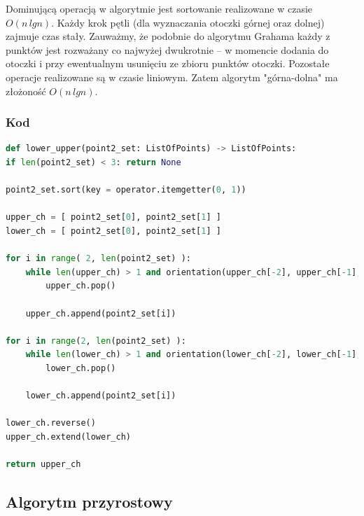 \documentclass[11pt]{article}
\theoremstyle{remark} \newtheorem{definition}{def.}
\theoremstyle{definition} \newtheorem{twierdzenie}{tw.}
\begin{document}
    Dominującą operacją w algorytmie jest sortowanie realizowane w czasie $O(n \, lgn)$. Każdy krok pętli (dla wyznaczania otoczki górnej oraz dolnej) zajmuje czas stały. Zauważmy, że podobnie do 
    algorytmu Grahama każdy z punktów jest rozważany co najwyżej dwukrotnie -- w momencie dodania do otoczki i przy ewentualnym usunięciu ze zbioru punktów otoczki. Pozostałe operacje realizowane są w 
    czasie liniowym. Zatem algorytm "górna-dolna" ma złożoność $O(n \, lgn)$.

    \subsubsection{Kod}

\begin{lstlisting}[language=Python]
def lower_upper(point2_set: ListOfPoints) -> ListOfPoints:
if len(point2_set) < 3: return None

point2_set.sort(key = operator.itemgetter(0, 1))

upper_ch = [ point2_set[0], point2_set[1] ] 
lower_ch = [ point2_set[0], point2_set[1] ]

for i in range( 2, len(point2_set) ):
    while len(upper_ch) > 1 and orientation(upper_ch[-2], upper_ch[-1], point2_set[i]) != -1:
        upper_ch.pop()

    upper_ch.append(point2_set[i])

for i in range(2, len(point2_set) ):
    while len(lower_ch) > 1 and orientation(lower_ch[-2], lower_ch[-1], point2_set[i]) != 1:
        lower_ch.pop()

    lower_ch.append(point2_set[i])

lower_ch.reverse()
upper_ch.extend(lower_ch)

return upper_ch
\end{lstlisting}



\subsection{Algorytm przyrostowy}
\end{document}
